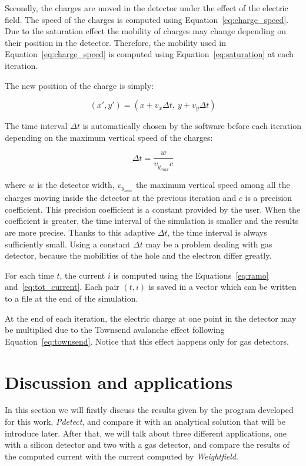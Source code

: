 \documentclass[11pt]{article}
\begin{document}
	Secondly, the charges are moved in the detector under the effect of the electric
	field. The speed of the charges is computed using Equation~\ref{eq:charge_speed}.
	Due to the saturation effect the mobility of charges may change depending on
	their position in the detector. Therefore, the mobility used in Equation~\ref{eq:charge_speed}
	is computed using Equation~\ref{eq:saturation} at each iteration.



	The new position of the charge is simply:

	\[(x',y') = (x + v_x \Delta t, \ y + v_y \Delta t)\]

	The time interval $\Delta t$ is automatically chosen by the software before
	each iteration depending on the maximum vertical speed of the charges:

	\[\Delta t = \frac{w}{v_{y_{max}} c}\]

	where $w$ is the detector width, $v_{y_{max}}$ the maximum vertical speed
	among all the charges moving inside the detector at the previous iteration and
	$c$ is a precision coefficient. This precision coefficient is a constant provided
	by the user. When the coefficient is greater, the time interval
	of the simulation is smaller and the results are more precise.
	Thanks to this adaptive $\Delta t$, the time interval is always sufficiently small.
	Using a constant $\Delta t$ may be a problem dealing with gas detector, because
	the mobilities of the hole and the electron differ greatly.

	For each time $t$, the current $i$ is computed using the Equations~\ref{eq:ramo}
	and~\ref{eq:tot_current}. Each pair $(t, i)$ is saved in a vector which can be
	written to a file at the end of the simulation.

	At the end of each iteration, the electric charge at one point in the detector
	may be multiplied due to the Townsend avalanche effect following Equation~\ref{eq:townsend}.
	Notice that this effect happens only for gas detectors.


\section{Discussion and applications}

	In this section we will firstly discuss the results given by the program developed
	for this work, \textit{Pdetect}, and compare it with an analytical solution that will be
	introduce later. After that, we will talk about three different applications, one with a
	silicon detector and two with a gas detector, and compare the results of the computed
	current with the current computed by \textit{Weightfield}.
\end{document}
